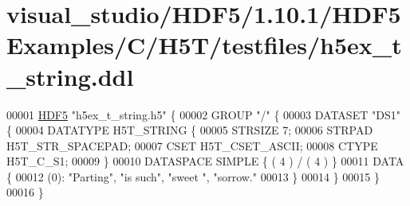 \hypertarget{visual__studio_2_h_d_f5_21_810_81_2_h_d_f5_examples_2_c_2_h5_t_2testfiles_2h5ex__t__string_8ddl_source}{}\section{visual\+\_\+studio/\+H\+D\+F5/1.10.1/\+H\+D\+F5\+Examples/\+C/\+H5\+T/testfiles/h5ex\+\_\+t\+\_\+string.ddl}
\label{visual__studio_2_h_d_f5_21_810_81_2_h_d_f5_examples_2_c_2_h5_t_2testfiles_2h5ex__t__string_8ddl_source}

\begin{DoxyCode}
00001 \hyperlink{namespace_h_d_f5}{HDF5} \textcolor{stringliteral}{"h5ex\_t\_string.h5"} \{
00002 GROUP \textcolor{stringliteral}{"/"} \{
00003    DATASET \textcolor{stringliteral}{"DS1"} \{
00004       DATATYPE  H5T\_STRING \{
00005          STRSIZE 7;
00006          STRPAD H5T\_STR\_SPACEPAD;
00007          CSET H5T\_CSET\_ASCII;
00008          CTYPE H5T\_C\_S1;
00009       \}
00010       DATASPACE  SIMPLE \{ ( 4 ) / ( 4 ) \}
00011       DATA \{
00012       (0): \textcolor{stringliteral}{"Parting"}, \textcolor{stringliteral}{"is such"}, \textcolor{stringliteral}{"sweet  "}, \textcolor{stringliteral}{"sorrow."}
00013       \}
00014    \}
00015 \}
00016 \}
\end{DoxyCode}
